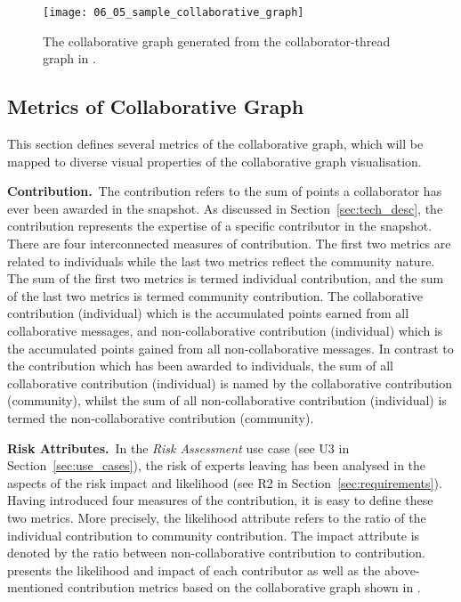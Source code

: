 \begin{figure}[!htb]
  \centering
  \texttt{[image: 06\_05\_sample\_collaborative\_graph]}
  \caption{The collaborative graph generated from the collaborator-thread graph in .}
  \label{Figure:06_05}
\end{figure}

\subsection{Metrics of Collaborative Graph} \label{sec:collaborative_graph_metrics}

This section defines several metrics of the collaborative graph, which will be mapped to diverse visual properties of the collaborative graph visualisation.

\textbf{Contribution.}~The contribution refers to the sum of points a collaborator has ever been awarded in the snapshot. As discussed in Section~\ref{sec:tech_desc}, the contribution represents the expertise of a specific contributor in the snapshot. There are four interconnected measures of contribution. The first two metrics are related to individuals while the last two metrics reflect the community nature. The sum of the first two metrics is termed individual contribution, and the sum of the last two metrics is termed community contribution. The collaborative contribution (individual) which is the accumulated points earned from all collaborative messages, and non-collaborative contribution (individual) which is the accumulated points gained from all non-collaborative messages. In contrast to the contribution which has been awarded to individuals, the sum of all collaborative contribution (individual) is named by the collaborative contribution (community), whilst the sum of all non-collaborative contribution (individual) is termed the non-collaborative contribution (community).

\textbf{Risk Attributes.}~In the \emph{Risk Assessment} use case (see U3 in Section~\ref{sec:use_cases}), the risk of experts leaving has been analysed in the aspects of the risk impact and likelihood (see R2 in Section~\ref{sec:requirements}). Having introduced four measures of the contribution, it is easy to define these two metrics. More precisely, the likelihood attribute refers to the ratio of the individual contribution to community contribution. The impact attribute is denoted by the ratio between non-collaborative contribution to contribution.  presents the likelihood and impact of each contributor as well as the above-mentioned contribution metrics based on the collaborative graph shown in .

